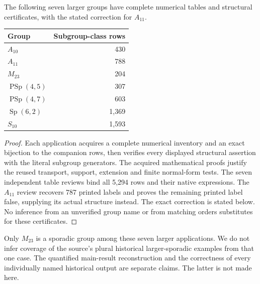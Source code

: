 \documentclass[11pt]{article}
\begin{document}
\begin{proposition}
The following seven larger groups have complete numerical tables and
structural certificates, with the stated correction for $A_{11}$.
\end{proposition}
\begin{center}
\begin{tabular}{lr}\toprule
Group & Subgroup-class rows\\\midrule
$A_{10}$ & 430\\
$A_{11}$ & 788\\
$M_{23}$ & 204\\
$\operatorname{PSp}(4,5)$ & 307\\
$\operatorname{PSp}(4,7)$ & 603\\
$\operatorname{Sp}(6,2)$ & 1,369\\
$S_{10}$ & 1,593\\\bottomrule
\end{tabular}
\end{center}
\begin{proof}
Each application acquires a complete numerical inventory and an exact
bijection to the companion rows, then verifies every displayed structural
assertion with the literal subgroup generators. The acquired mathematical
proofs justify the reused transport, support, extension and finite
normal-form tests. The seven independent table reviews bind all 5,294
rows and their native expressions. The $A_{11}$ review recovers 787 printed
labels and proves the remaining printed label false, supplying its actual
structure instead. The exact correction is stated below. No inference from
an unverified group name or from matching orders substitutes for these
certificates.
\end{proof}

Only $M_{23}$ is a sporadic group among these seven larger applications.
We do not infer coverage of the source's plural historical larger-sporadic
examples from that one case. The quantified main-result reconstruction and
the correctness of every individually named historical output are separate
claims. The latter is not made here.
\end{document}
